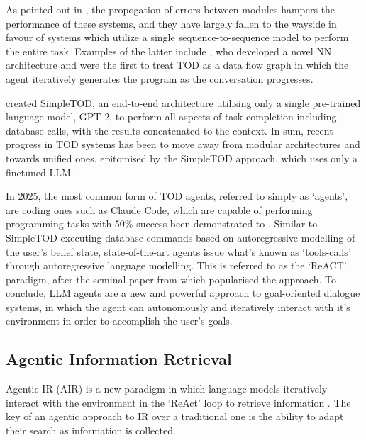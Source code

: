 \documentclass[11pt]{article}
\begin{document}
As pointed out in \citet{yi_survey_2025}, the propogation of errors between modules hampers the performance of these systems, and they have largely fallen to the wayside in favour of systems which utilize a single sequence-to-sequence model to perform the entire task. Examples of the latter include \citet{wen_network-based_2017}, who developed a novel NN architecture and \citet{andreas_task-oriented_2020} were the first to treat TOD as a data flow graph in which the agent iteratively generates the program as the conversation progresses.

\citet{hosseini-asl_simple_2022} created SimpleTOD, an end-to-end architecture utilising only a single pre-trained language model, GPT-2, to perform all aspects of task completion including database calls, with the results concatenated to the context.
In sum, recent progress in TOD systems has been to move away from modular architectures and towards unified ones, epitomised by the SimpleTOD approach, which uses only a finetuned LLM. 


In 2025, the most common form of TOD agents, referred to simply as `agents', are coding ones such as Claude Code, which are capable of performing programming tasks with 50\% success 
been demonstrated to \cite{kwa_measuring_2025}.
Similar to SimpleTOD executing database commands based on autoregressive modelling of the user's belief state, state-of-the-art agents issue what's known as `tools-calls' through autoregressive language modelling. This is referred to as the `ReACT' paradigm, after the seminal paper from \citet{yao_reac_2023} which popularised the approach. To conclude, LLM agents are a new and powerful approach to goal-oriented dialogue systems, in which the agent can autonomously and iteratively interact with it's environment in order to accomplish the user's goals.


\subsection{Agentic Information Retrieval}
Agentic IR (AIR) is a new paradigm in which language models iteratively interact with the environment in the `ReAct' loop to retrieve information \citet{zhang_agentic_2025}.
The key of an agentic approach to IR over a traditional one is the ability to adapt their search as information is collected.
\end{document}
